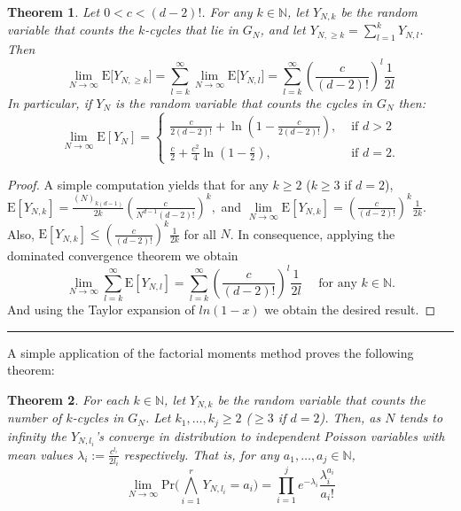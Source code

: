\documentclass[11pt,notitlepage,a4paper]{article}
\newtheorem{theorem}{Theorem}[section]
\theoremstyle{definition}
\newcommand{\N}{\mathbb{N}}
\newcommand{\LN}{\lim\limits_{N\to \infty}}
\begin{document}
	\begin{theorem} \label{thm:expectedcycles}
		Let $0< c< (d-2)!$. For any $k\in \N$, 
		let $Y_{N,k}$ be the random
		variable that counts
		the $k$-cycles that lie in $G_N$,
		and let $Y_{N,\geq k}= \sum_{l=1}^k Y_{N,l}$.
		Then
		\[
		\LN \mathrm{E}\big[Y_{N,\geq k}\big]=
		\sum_{l=k}^{\infty} \LN \mathrm{E}
		\big[Y_{N,l}\big]=
		\sum_{l=k}^{\infty} 
		\left(\frac{c}{(d-2)!}\right)^l \frac{1}{2l}
		\] 	
		In particular, if $Y_N$ is the random variable that counts the cycles
		in $G_N$ then:
		\[
		\LN \mathrm{E}[Y_{N}]	= 
		\begin{cases}
		\frac{c}{2(d-2)!}+ \ln\left(1-\frac{c}{2(d-2)!}\right), &  
		\text{ if } d>2\\
		\frac{c}{2}+ \frac{c^2}{4} 
		\ln\left(1-\frac{c}{2}\right), &
		\text{ if } d=2.
		\end{cases}
		\]
	\end{theorem}
	\begin{proof}
	
		A simple computation yields that for 
		any $k\geq 2$ ($k\geq 3$ if $d=2$),
		$
		\mathrm{E}[Y_{N,k}]= 
		\frac{(N)_{k(d-1)}}{2k}
		\left(\frac{c}{N^{d-1}(d-2)!}\right)^k,$
		and
		$
		\LN	\mathrm{E}[Y_{N,k}]= 
		\left(\frac{c}{(d-2)!}\right)^k \frac{1}{2k}
		$.
		Also,
		$
		\mathrm{E}[Y_{N,k}]\leq \left(\frac{c}{(d-2)!}\right)^k \frac{1}{2k}$
		for all $N$. In consequence, applying the dominated convergence
		theorem we obtain
		\[ 
		\LN \sum_{l=k}^\infty \mathrm{E}[Y_{N,l}]=
		 \sum_{l=k}^\infty \left(\frac{c}{(d-2)!}\right)^l \frac{1}{2l} \quad 
		 \text{ for any } k\in \N.
		\]
		And using the Taylor expansion of $ln(1-x)$ we obtain
		the desired	result. 
	\end{proof}
	\noindent\rule{2cm}{0.4pt}\par

	
	
	A simple application of the factorial moments method proves the following
	theorem:
	\begin{theorem} \label{thm:probcycles} 
		For each $k\in \N$, let $Y_{N,k}$ be the random variable
		that counts the number of $k$-cycles in $G_N$.
		Let $k_1,\dots,k_j\geq 2$ ($\geq 3$ if $d=2$). Then, 
		as $N$ tends to infinity the $Y_{N,l_i}$'s converge 
		in distribution to independent Poisson variables
		with mean values $\lambda_i:=\frac{c^{l_i}}{2l_i}$ respectively.
		That is, for any $a_1,\dots,a_j\in \N$,
		\[
		\LN \mathrm{Pr}\Big(
		\bigwedge_{i=1}^r
		Y_{N,l_i}=a_i		
		\Big)= \prod_{i=1}^{j} e^{-\lambda_i}\frac{\lambda_i^{a_i}}{a_i!}
		\]
	\end{theorem}
		
\end{document}
